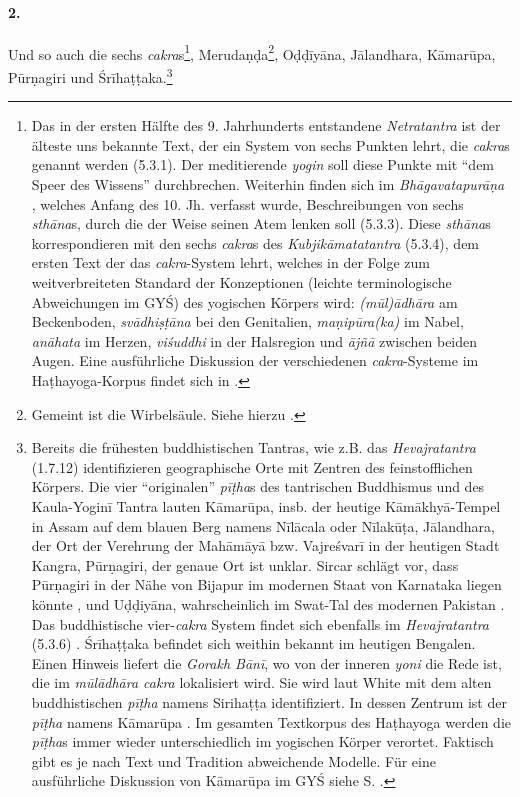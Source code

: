 \documentclass[a4paper,12pt]{article}
\begin{document}
\label{cakras}
\paragraph{2.} Und so auch die sechs \textit{cakra}s\footnote{Das in der ersten Hälfte des 9. Jahrhunderts entstandene \textit{Netratantra} \parencite{netratantra} ist der älteste uns bekannte Text, der ein System von sechs Punkten lehrt, die \textit{cakra}s genannt werden (5.3.1). Der meditierende \textit{yogin} soll diese Punkte mit ``dem Speer des Wissens'' durchbrechen. Weiterhin finden sich im \textit{Bhāgavatapurāṇa} \parencite{bhagavata}, welches Anfang des 10. Jh. verfasst wurde, Beschreibungen von sechs \textit{sthāna}s, durch die der Weise seinen Atem lenken soll (5.3.3). Diese \textit{sthāna}s  korrespondieren mit den sechs \textit{cakra}s des \textit{Kubjikāmatatantra} (5.3.4), dem ersten Text der das \textit{cakra}-System lehrt, welches in der Folge zum weitverbreiteten Standard der Konzeptionen (leichte terminologische Abweichungen im GYŚ) des yogischen Körpers wird: \textit{(mūl)ādhāra} am Beckenboden, \textit{svādhiṣṭāna} bei den Genitalien, \textit{maṇipūra(ka)} im Nabel, \textit{anāhata} im Herzen, \textit{viśuddhi} in der Halsregion und \textit{ājñā} zwischen beiden Augen. Eine ausführliche Diskussion der verschiedenen \textit{cakra}-Systeme im Haṭhayoga-Korpus findet sich in \parencite[175-178, 203-213]{rootsofyoga2017}.}, Merudaṇḍa\footnote{Gemeint ist die Wirbelsäule. Siehe hierzu \parencite[260, 328]{white1996}.}, Oḍḍīyāna, Jālandhara, Kāmarūpa, Pūrṇagiri und Śrīhaṭṭaka.\footnote{Bereits die frühesten buddhistischen Tantras, wie z.B. das \textit{Hevajratantra} (1.7.12) \parencite{hevajra} identifizieren geographische Orte mit Zentren des feinstofflichen Körpers. Die vier ``originalen'' \textit{pīṭha}s des tantrischen Buddhismus und des Kaula-Yoginī Tantra lauten Kāmarūpa, insb. der heutige Kāmākhyā-Tempel in Assam auf dem blauen Berg namens Nīlācala oder Nīlakūṭa, Jālandhara, der Ort der Verehrung der Mahāmāyā bzw. Vajreśvarī in der heutigen Stadt Kangra, Pūrṇagiri, der genaue Ort ist unklar. Sircar schlägt vor, dass Pūrṇagiri in der Nähe von Bijapur im modernen Staat von Karnataka liegen könnte \parencite[14]{sircar}, und Uḍḍiyāna, wahrscheinlich im Swat-Tal des modernen Pakistan \parencite[31-37]{urban2010}. Das buddhistische vier-\textit{cakra} System findet sich ebenfalls im \textit{Hevajratantra} (5.3.6) \parencite[171]{rootsofyoga2017}. Śrīhaṭṭaka befindet sich weithin bekannt im heutigen Bengalen. Einen Hinweis liefert die \textit{Gorakh Bānī}, wo von der inneren \textit{yoni} die Rede ist, die im \textit{mūlādhāra cakra} lokalisiert wird. Sie wird laut White mit dem alten buddhistischen \textit{pīṭha} namens Sirihaṭṭa identifiziert. In dessen Zentrum ist der \textit{pīṭha} namens Kāmarūpa \parencite[485]{white1996}. Im gesamten Textkorpus des Haṭhayoga werden die \textit{pīṭha}s immer wieder unterschiedlich im yogischen Körper verortet. Faktisch gibt es je nach Text und Tradition abweichende Modelle. Für eine ausführliche Diskussion von Kāmarūpa im GYŚ siehe S. \pageref{kamarupa}.}  
\end{document}
